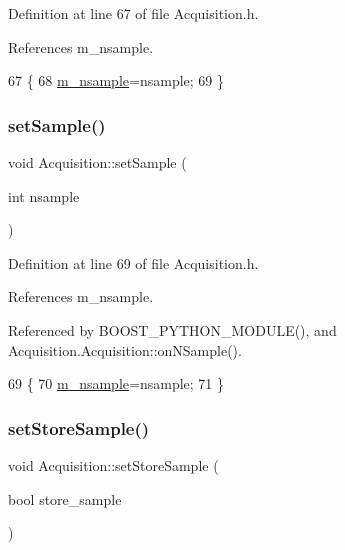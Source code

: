 Definition at line 67 of file Acquisition.\+h.



References m\+\_\+nsample.


\begin{DoxyCode}
67                              \{
68     \hyperlink{classAcquisition_a26d0f1a44309ffac49c365b7ee568ab2}{m\_nsample}=nsample;
69   \}
\end{DoxyCode}
\mbox{\label{classAcquisition_ade6fd6483b3e3737fe7dcdffb5065954}} 
\subsubsection{\texorpdfstring{set\+Sample()}{setSample()}\hspace{0.1cm}{\footnotesize\ttfamily [2/2]}}
{\footnotesize\ttfamily void Acquisition\+::set\+Sample (\begin{DoxyParamCaption}\item[{int}]{nsample }\end{DoxyParamCaption})\hspace{0.3cm}{\ttfamily [inline]}}



Definition at line 69 of file Acquisition.\+h.



References m\+\_\+nsample.



Referenced by B\+O\+O\+S\+T\+\_\+\+P\+Y\+T\+H\+O\+N\+\_\+\+M\+O\+D\+U\+L\+E(), and Acquisition.\+Acquisition\+::on\+N\+Sample().


\begin{DoxyCode}
69                              \{
70     \hyperlink{classAcquisition_a26d0f1a44309ffac49c365b7ee568ab2}{m\_nsample}=nsample;
71   \}
\end{DoxyCode}
\mbox{\label{classAcquisition_af36a1b660244096b7d274f591f67b695}} 
\subsubsection{\texorpdfstring{set\+Store\+Sample()}{setStoreSample()}\hspace{0.1cm}{\footnotesize\ttfamily [1/2]}}
{\footnotesize\ttfamily void Acquisition\+::set\+Store\+Sample (\begin{DoxyParamCaption}\item[{bool}]{store\+\_\+sample }\end{DoxyParamCaption})\hspace{0.3cm}{\ttfamily [inline]}}



